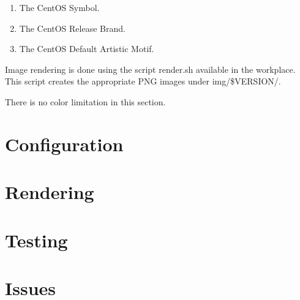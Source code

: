 \documentclass{article}
\begin{document}
\begin{enumerate}
\item The CentOS Symbol.
\item The CentOS Release Brand.
\item The CentOS Default Artistic Motif.
\end{enumerate}

Image rendering is done using the script render.sh available in the
workplace.  This script creates the appropriate PNG images under
img/\$VERSION/.

There is no color limitation in this section.

\section{Configuration}
\section{Rendering}
\section{Testing}
\section{Issues}


\end{document}
